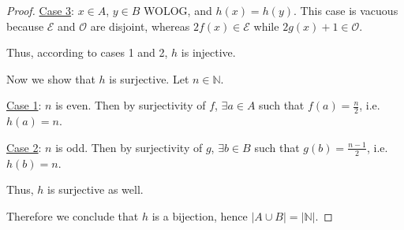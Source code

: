 \documentclass{article}
\begin{document}
\begin{proof}
	\underline{Case 3}: $x\in A$, $y\in B$ WOLOG, and $h(x)=h(y)$. This case is vacuous because $\mathcal{E}$ and $\mathcal{O}$ are disjoint, whereas $2f(x)\in\mathcal{E}$ while $2g(x) + 1 \in\mathcal{O}$.
	
	Thus, according to cases 1 and 2, $h$ is injective.
	
	Now we show that $h$ is surjective. Let $n\in\mathbb{N}$.
	
	\underline{Case 1}: $n$ is even. Then by surjectivity of $f$, $\exists a \in A$ such that $f(a)=\frac{n}{2}$, i.e. $h(a)=n$.
	
	\underline{Case 2}: $n$ is odd. Then by surjectivity of $g$, $\exists b \in B$ such that $g(b)=\frac{n-1}{2}$, i.e. $h(b)=n$.
	
	Thus, $h$ is surjective as well.
	
	Therefore we conclude that $h$ is a bijection, hence $|A\cup B| = |\mathbb{N}|$.
\end{proof}
\end{document}
